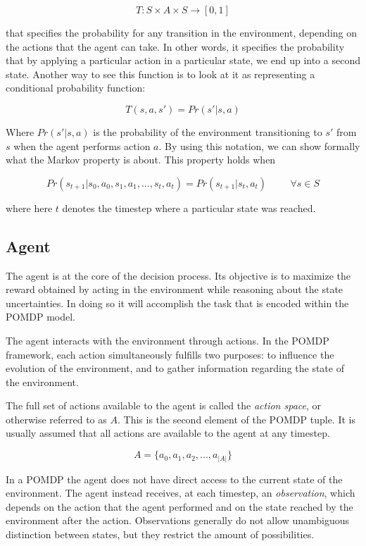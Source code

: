 \[ T: S\times A \times S \rightarrow [0,1] \]

that specifies the probability for any transition in the environment, depending on the actions that
the agent can take. In other words, it specifies the probability that by applying a particular
action in a particular state, we end up into a second state. Another way to see this
function is to look at it as representing a conditional probability function:

\[ T(s, a, s') = Pr(s' | s, a) \]

Where $Pr(s'|s,a)$ is the probability of the environment transitioning to $s'$ from $s$ when the
agent performs action $a$. By using this notation, we can show formally what the Markov property is
about. This property holds when

\[ Pr(s_{t+1} | s_{0}, a_{0}, s_{1}, a_{1}, ..., s_{t}, a_{t} ) = Pr(s_{t+1} | s_t, a_t ) \hspace{1cm} \forall s \in S \]

where here $t$ denotes the timestep where a particular state was reached.


\subsection{Agent}

The agent is at the core of the decision process. Its objective is to maximize the reward obtained
by acting in the environment while reasoning about the state uncertainties. In doing so it will
accomplish the task that is encoded within the POMDP model.

The agent interacts with the environment through actions. In the POMDP framework, each action
simultaneously fulfills two purposes: to influence the evolution of the environment, and to gather
information regarding the state of the environment.

The full set of actions available to the agent is called the \textit{action space}, or otherwise
referred to as $A$. This is the second element of the POMDP tuple. It is usually assumed that all
actions are available to the agent at any timestep.

\[ A = \{ a_0, a_1, a_2, ..., a_{|A|} \} \]

In a POMDP the agent does not have direct access to the current state of the environment. The agent
instead receives, at each timestep, an \textit{observation}, which depends on the action that the
agent performed and on the state reached by the environment after the action. Observations generally
do not allow unambiguous distinction between states, but they restrict the amount of possibilities.

